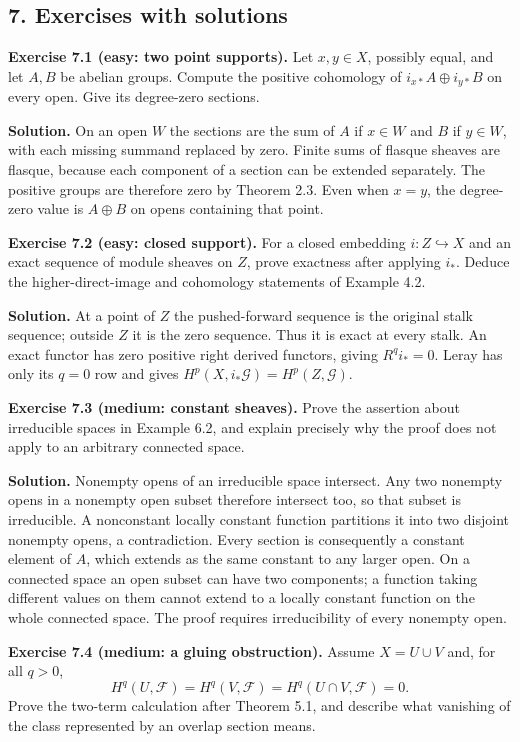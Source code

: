 \documentclass[11pt]{article}
\begin{document}
\subsection{7. Exercises with solutions}\label{exercises-with-solutions}

\textbf{Exercise 7.1 (easy: two point supports).} Let \(x,y\in X\),
possibly equal, and let \(A,B\) be abelian groups. Compute the positive
cohomology of \(i_{x*}A\oplus i_{y*}B\) on every open. Give its
degree-zero sections.

\textbf{Solution.} On an open \(W\) the sections are the sum of \(A\) if
\(x\in W\) and \(B\) if \(y\in W\), with each missing summand replaced
by zero. Finite sums of flasque sheaves are flasque, because each
component of a section can be extended separately. The positive groups
are therefore zero by Theorem 2.3. Even when \(x=y\), the degree-zero
value is \(A\oplus B\) on opens containing that point.

\textbf{Exercise 7.2 (easy: closed support).} For a closed embedding
\(i:Z\hookrightarrow X\) and an exact sequence of module sheaves on
\(Z\), prove exactness after applying \(i_*\). Deduce the
higher-direct-image and cohomology statements of Example 4.2.

\textbf{Solution.} At a point of \(Z\) the pushed-forward sequence is
the original stalk sequence; outside \(Z\) it is the zero sequence. Thus
it is exact at every stalk. An exact functor has zero positive right
derived functors, giving \(R^qi_*=0\). Leray has only its \(q=0\) row
and gives \(H^p(X,i_*\mathcal G)=H^p(Z,\mathcal G)\).

\textbf{Exercise 7.3 (medium: constant sheaves).} Prove the assertion
about irreducible spaces in Example 6.2, and explain precisely why the
proof does not apply to an arbitrary connected space.

\textbf{Solution.} Nonempty opens of an irreducible space intersect. Any
two nonempty opens in a nonempty open subset therefore intersect too, so
that subset is irreducible. A nonconstant locally constant function
partitions it into two disjoint nonempty opens, a contradiction. Every
section is consequently a constant element of \(A\), which extends as
the same constant to any larger open. On a connected space an open
subset can have two components; a function taking different values on
them cannot extend to a locally constant function on the whole connected
space. The proof requires irreducibility of every nonempty open.

\textbf{Exercise 7.4 (medium: a gluing obstruction).} Assume
\(X=U\cup V\) and, for all \(q>0\), \[
H^q(U,\mathcal F)=H^q(V,\mathcal F)=H^q(U\cap V,\mathcal F)=0.
\] Prove the two-term calculation after Theorem 5.1, and describe what
vanishing of the class represented by an overlap section means.
\end{document}
